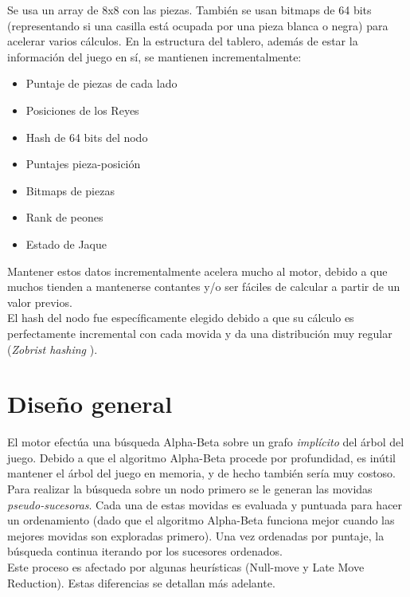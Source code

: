 \documentclass{article}
\begin{document}
\begin{multicols}{2}
Se usa un array de 8x8 con las piezas. También se usan bitmaps de
64 bits (representando si una casilla está ocupada por una pieza
blanca o negra) para acelerar varios cálculos. En la estructura del
tablero, además de estar la información del juego en sí, se mantienen
incrementalmente:

\begin{itemize}
\setlength\itemsep{0em}
\item Puntaje de piezas de cada lado
\item Posiciones de los Reyes
\item Hash de 64 bits del nodo
\item Puntajes pieza-posición
\item Bitmaps de piezas
\item Rank de peones
\item Estado de Jaque
\end{itemize}

Mantener estos datos incrementalmente acelera mucho al motor, debido
a que muchos tienden a mantenerse contantes y/o ser fáciles de calcular
a partir de un valor previos.
\\

El hash del nodo fue específicamente elegido debido a que su cálculo
es perfectamente incremental con cada movida y da una distribución muy
regular (\emph{Zobrist hashing} \cite{wiki:zobrist}).

\section{Diseño general}

El motor efectúa una búsqueda Alpha-Beta sobre un grafo \emph{implícito}
del árbol del juego. Debido a que el algoritmo Alpha-Beta procede
por profundidad, es inútil mantener el árbol del juego en memoria, y
de hecho también sería muy costoso.
\\

Para realizar la búsqueda sobre un nodo primero se le generan las
movidas \emph{pseudo-sucesoras}. Cada una de estas movidas es evaluada
y puntuada para hacer un ordenamiento (dado que el algoritmo Alpha-Beta
funciona mejor cuando las mejores movidas son exploradas primero).
Una vez ordenadas por puntaje, la búsqueda continua iterando por los
sucesores ordenados.
\\

Este proceso es afectado por algunas heurísticas (Null-move y Late Move
Reduction). Estas diferencias se detallan más adelante.
\\


\end{multicols}
\end{document}
